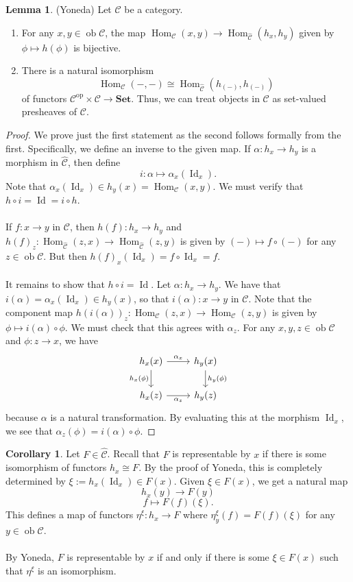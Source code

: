\documentclass[10pt,letterpaper,cm]{nupset}
\theoremstyle{definition}
\newtheorem{corollary}{Corollary}
\newtheorem{lemma}{Lemma}
\newcommand{\1}{\mathbf{1}}
\renewcommand{\c}{\mathscr{C}}
\newcommand{\0}{\vec 0}
\DeclareMathOperator{\id}{Id}
\DeclareMathOperator{\op}{op}
\DeclareMathOperator{\ob}{ob}
\DeclareMathOperator{\Hom}{Hom}
\begin{document}
\begin{lemma}{(Yoneda)} Let $\c$ be a category.
\begin{enumerate}
\item For any $x, y \in \ob \c$, the map $\Hom_{\c}(x, y) \to \Hom_{\widehat{\c}}(h_x, h_y)$ given by $\phi \mapsto h(\phi)$ is bijective.
\item There is a natural isomorphism $$\Hom_{\c}(-, -) \cong \Hom_{\widehat{\c}}(h_{(-)}, h_{(-)})$$ of functors $ \c^{\op} \times \c \to \mathbf{Set}$. Thus, we can treat objects in $\c$ as set-valued presheaves of $\c$.
\end{enumerate}
\end{lemma}
\begin{proof}
We prove just the first statement as the second follows formally from the first.
Specifically, we define an inverse to the given map. If $\alpha : h_x \to h_y$ is a morphism in $\widehat{\c}$, then define $$i : \alpha \mapsto \alpha_x(\id_x).$$ Note that $\alpha_x(\id_x) \in h_y(x) = \Hom_{\c}(x,y)$. We must verify that $h \circ i = \id = i \circ h$.
\\ \\ If $f: x \to y$ in $\c$, then $h(f) : h_x \to h_y$ and $h(f)_z : \Hom_{\widehat{\c}}(z, x) \to \Hom_{\widehat{\c}}(z, y)$ is given by $(-) \mapsto f \circ (-)$ for any $z\in \ob \c$. But then $h(f)_x(\id_x) = f\circ \id_x = f$.
\\ \\ It remains to show that $h \circ i = \id$. Let $\alpha : h_x \to h_y$.  We have that $
i(\alpha) = \alpha_x(\id_x) \in h_y(x)$, so that $i(\alpha) : x \to y$ in $\c$. Note that the component map $h(i(\alpha))_z : \Hom_{\c}(z, x) \to \Hom_{\c}(z, y)$ is given by $\phi \mapsto i(\alpha) \circ \phi.$ We must check that this agrees with $\alpha_z$. For any $x, y, z \in \ob \c$ and $\phi : z \to x$, we have
\[
\begin{tikzcd}
h_x(x) \arrow[r, "\alpha_x"] \arrow[d, "h_x(\phi)"'] & h_y(x) \arrow[d, "h_y(\phi)"] \\
h_x(z) \arrow[r, "\alpha_z"'] & h_y(z)
\end{tikzcd}
\]
because $\alpha$ is a natural transformation. By evaluating this at the morphism $\id_x$, we see that $\alpha_z(\phi) = i(\alpha) \circ \phi$.
\end{proof}

\begin{corollary}
Let $F \in \widehat{\c}$. Recall that $F$ is representable by $x$ if there is some isomorphism of functors $h_x \cong F$. By the proof of Yoneda, this is completely determined by $\xi:= h_x(\id_x) \in F(x)$. Given $\xi \in F(x)$, we get a natural map $$h_x(y) \to F(y)$$ $$ f \mapsto F(f)(\xi).$$ This defines a map of functors $\eta^{\xi} : h_x \to F$ where $\eta^{\xi}_y(f) = F(f)(\xi)$ for any $y \in \ob \c$. 
\\ \\ By Yoneda, $F$ is representable by $x$ if and only if there is some $\xi \in F(x)$ such that $\eta^{\xi}$ is an isomorphism. 
\end{corollary}
\end{document}
